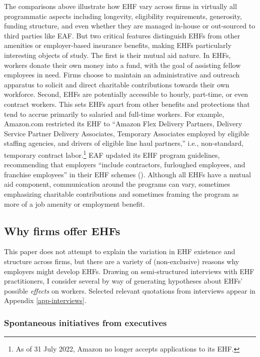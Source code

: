 \documentclass[
  11pt,
  oneside]{article}
\begin{document}
The comparisons above illustrate how EHF vary across firms in virtually all programmatic aspects including longevity, eligibility requirements, generosity, funding structure, and even whether they are managed in-house or out-sourced to third parties like EAF. But two critical features distinguish EHFs from other amenities or employer-based insurance benefits, making EHFs particularly interesting objects of study. The first is their mutual aid nature. In EHFs, workers donate their own money into a fund, with the goal of assisting fellow employees in need. Firms choose to maintain an administrative and outreach apparatus to solicit and direct charitable contributions towards their own workforce. Second, EHFs are potentially accessible to hourly, part-time, or even contract workers. This sets EHFs apart from other benefits and protections that tend to accrue primarily to salaried and full-time workers. For example, Amazon.com restricted its EHF to ``Amazon Flex Delivery Partners, Delivery Service Partner Delivery Associates, Temporary Associates employed by eligible staffing agencies, and drivers of eligible line haul partners,'' i.e., non-standard, temporary contract labor.\footnote{As of 31 July 2022, Amazon no longer accepts applications to its EHF.} EAF updated its EHF program guidelines, recommending that employers ``include contractors, furloughed employees, and franchise employees'' in their EHF schemes (). Although all EHFs have a mutual aid component, communication around the programs can vary, sometimes emphasizing charitable contributions and sometimes framing the program as more of a job amenity or employment benefit.

\subsection{Why firms offer EHFs}\label{why-firms-offer-ehfs}

This paper does not attempt to explain the variation in EHF existence and structure across firms, but there are a variety of (non-exclusive) reasons why employers might develop EHFs. Drawing on semi-structured interviews with EHF practitioners, I consider several by way of generating hypotheses about EHFs' possible \emph{effects} on workers. Selected relevant quotations from interviews appear in Appendix \ref{app-interviews}.

\subsubsection{Spontaneous initiatives from executives}\label{spontaneous-initiatives-from-executives}
\end{document}
